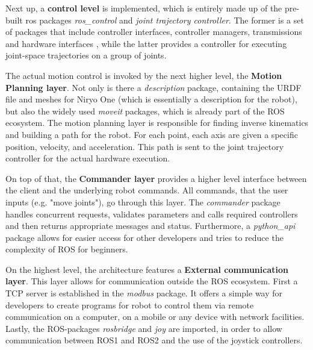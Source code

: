\documentclass[%
paper=A4,               %
twoside=true,           %
openright,              %
11pt,                   %
bibliography=totoc,     %
titlepage=on,           %
DIV=12,                 %
BCOR=1.5cm,             %
parskip=half,            %
final
]{scrreprt}
\begin{document}
	Next up, a \textbf{control level} is implemented, which is entirely made up of the pre-built ros packages \textit{ros\_control} and \textit{joint trajectory controller}. The former is a set of packages that include controller interfaces, controller managers, transmissions and hardware interfaces \autocite{ros.orgROSControl2024a}, while the latter provides a controller for executing joint-space trajectories on a group of joints. \autocite{ros.orgJointTrajectoryController2024} \newline
	
	The actual motion control is invoked by the next higher level, the \textbf{Motion Planning layer}. Not only is there a \textit{description} package, containing the URDF file and meshes for Niryo One (which is essentially a description for the robot), but also the widely used \textit{moveit} packages, which is already part of the ROS ecosystem. The motion planning layer is responsible for finding inverse kinematics and building a path for the robot.\autocite{roboticsGetStartedNiryo2024,ros.orgMoveItConcepts2024} For each point, each axis are given a specific position, velocity, and acceleration. This path is sent to the joint trajectory controller for the actual hardware execution. \autocite{roboticsGetStartedNiryo2024}
	
	On top of that, the \textbf{Commander layer} provides a higher level interface between the client and the underlying robot commands. All commands, that the user inputs (e.g. "move joints"), go through this layer. The \textit{commander} package handles concurrent requests, validates parameters and calls required controllers and then returns appropriate messages and status. 
	Furthermore, a \textit{python\_api} package allows for easier access for other developers and tries to reduce the complexity of ROS for beginners. \autocite{roboticsGetStartedNiryo2024,roboticsNiryoOneROS2024}
	
	On the highest level, the architecture features a \textbf{External communication layer}.  This layer allows for communication outside the ROS ecosystem. First a TCP server is established in the \textit{modbus} package. It offers a simple way for developers to create programs for robot to control them via remote communication on a computer, on a mobile or any device with network facilities. Lastly, the ROS-packages \textit{rosbridge} and \textit{joy} are imported, in order to allow communication between ROS1 and ROS2 and the use of the joystick controllers. \autocite{roboticsGetStartedNiryo2024,roboticsNiryoOneROS2024}
	
\end{document}
